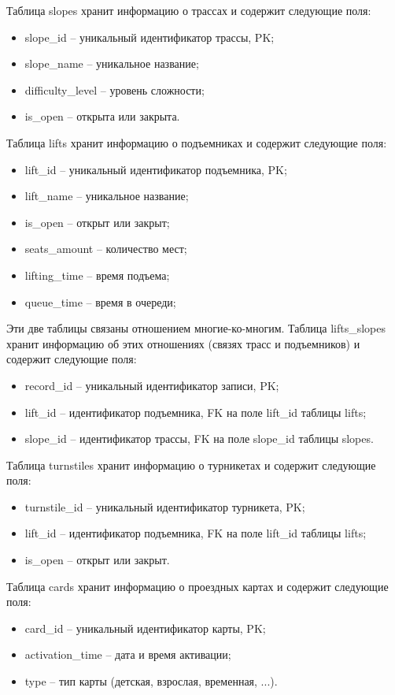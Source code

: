 Таблица slopes хранит информацию о трассах и содержит следующие поля:
\begin{itemize}
	\item slope\_id -- уникальный идентификатор трассы, PK;
	\item slope\_name -- уникальное название;
	\item difficulty\_level -- уровень сложности;
	\item is\_open -- открыта или закрыта.
\end{itemize}


Таблица lifts хранит информацию о подъемниках и содержит следующие поля:
\begin{itemize}
	\item lift\_id -- уникальный идентификатор подъемника, PK;
	\item lift\_name -- уникальное название;
	\item is\_open -- открыт или закрыт;
	\item seats\_amount -- количество мест;
	\item lifting\_time -- время подъема;
	\item queue\_time -- время в очереди;
\end{itemize}


Эти две таблицы связаны отношением многие-ко-многим. Таблица lifts\_slopes хранит информацию об этих отношениях (связях трасс и подъемников) и содержит следующие поля:
\begin{itemize}
	\item record\_id -- уникальный идентификатор записи, PK;
	\item lift\_id -- идентификатор подъемника, FK на поле lift\_id таблицы lifts;
	\item slope\_id -- идентификатор трассы, FK на поле slope\_id таблицы slopes.
\end{itemize}


Таблица turnstiles хранит информацию о турникетах и содержит следующие поля:
\begin{itemize}
	\item turnstile\_id -- уникальный идентификатор турникета, PK;
	\item lift\_id -- идентификатор подъемника, FK на поле lift\_id таблицы lifts;
	\item is\_open -- открыт или закрыт.
\end{itemize}


Таблица cards хранит информацию о проездных картах и содержит следующие поля:
\begin{itemize}
	\item card\_id -- уникальный идентификатор карты, PK;
	\item activation\_time -- дата и время активации;
	\item type -- тип карты (детская, взрослая, временная, ...).
\end{itemize}


